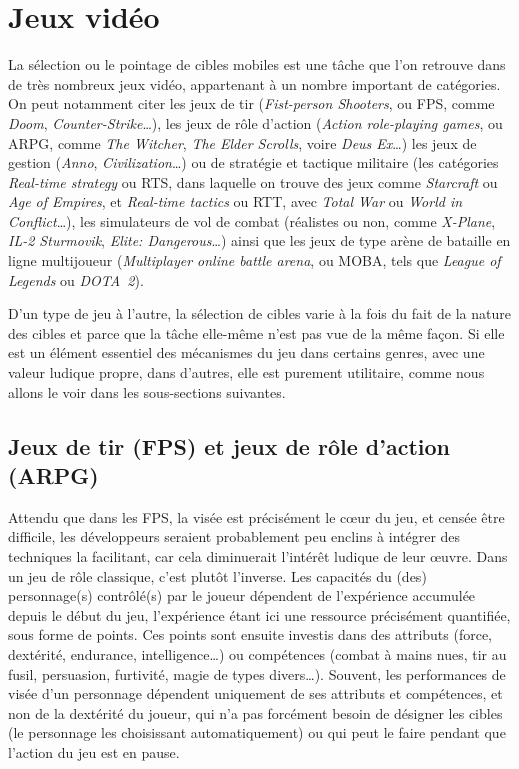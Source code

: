 	\section{Jeux vidéo}
	La sélection ou le pointage de cibles mobiles est une tâche que l'on retrouve dans de très nombreux jeux vidéo, appartenant à un nombre important de catégories. On peut notamment citer les jeux de tir (\emph{Fist-person Shooters}, ou FPS, comme \emph{Doom}, \emph{Counter-Strike}\ldots{}), les jeux de rôle d'action (\emph{Action role-playing games}, ou ARPG, comme \emph{The Witcher}, \emph{The Elder Scrolls}, voire \emph{Deus Ex}\ldots{}) les jeux de gestion (\emph{Anno}, \emph{Civilization}\ldots{}) ou de stratégie et tactique militaire (les catégories \emph{Real-time strategy} ou RTS, dans laquelle on trouve des jeux comme \emph{Starcraft} ou \emph{Age of Empires}, et \emph{Real-time tactics} ou RTT, avec \emph{Total War} ou \emph{World in Conflict}\ldots{}), les simulateurs de vol de combat (réalistes ou non, comme \emph{X-Plane}, \emph{IL-2 Sturmovik}, \emph{Elite: Dangerous}\ldots{}) ainsi que les jeux de type arène de bataille en ligne multijoueur (\emph{Multiplayer online battle arena}, ou MOBA, tels que \emph{League of Legends} ou \emph{DOTA~2}).
	
	D'un type de jeu à l'autre, la sélection de cibles varie à la fois du fait de la nature des cibles et parce que la tâche elle-même n'est pas vue de la même façon. Si elle est un élément essentiel des mécanismes du jeu dans certains genres, avec une valeur ludique propre, dans d'autres, elle est purement utilitaire, comme nous allons le voir dans les sous-sections suivantes.
	
	\subsection{Jeux de tir (FPS) et jeux de rôle d'action (ARPG)}
	Attendu que dans les FPS, la visée est précisément le cœur du jeu, et censée être difficile, les développeurs seraient probablement peu enclins à intégrer des techniques la facilitant, car cela diminuerait l'intérêt ludique de leur œuvre. Dans un jeu de rôle classique, c'est plutôt l'inverse. Les capacités du (des) personnage(s) contrôlé(s) par le joueur dépendent de l'expérience accumulée depuis le début du jeu, l'expérience étant ici une ressource précisément quantifiée, sous forme de points. Ces points sont ensuite investis dans des attributs (force, dextérité, endurance, intelligence\ldots{}) ou compétences (combat à mains nues, tir au fusil, persuasion, furtivité, magie de types divers\ldots{}). Souvent, les performances de visée d'un personnage dépendent uniquement de ses attributs et compétences, et non de la dextérité du joueur, qui n'a pas forcément besoin de désigner les cibles (le personnage les choisissant automatiquement) ou qui peut le faire pendant que l'action du jeu est en pause.
	
